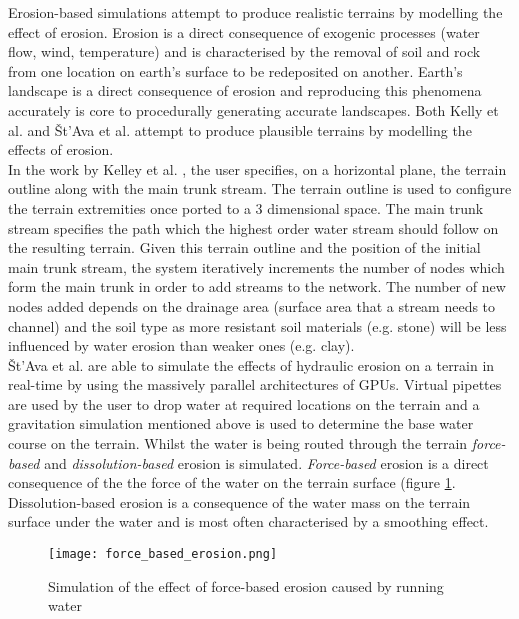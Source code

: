 Erosion-based simulations attempt to produce realistic terrains by modelling the effect of erosion. Erosion is a direct consequence of exogenic processes (water flow, wind, temperature) and is characterised by the removal of soil and rock from one location on earth's surface to be redeposited on another. Earth's landscape is a direct consequence of erosion and reproducing this phenomena accurately is core to procedurally generating accurate landscapes. Both Kelly et al. \cite{Kelley1988} and Št'Ava et al. \cite{StAva2008} attempt to produce plausible terrains by modelling the effects of erosion.\\

In the work by Kelley et al. \cite{Kelley1988}, the user specifies, on a horizontal plane, the terrain outline along with the main trunk stream. The terrain outline is used to configure the terrain extremities once ported to a 3 dimensional space. The main trunk stream specifies the path which the highest order water stream should follow on the resulting terrain. Given this terrain outline and the position of the initial main trunk stream, the system iteratively increments the number of nodes which form the main trunk in order to add streams to the network. The number of new nodes added depends on the drainage area (surface area that a stream needs to channel) and the soil type as more resistant soil materials (e.g. stone) will be less influenced by water erosion than weaker ones (e.g. clay). \\

Št'Ava et al. \cite{StAva2008} are able to simulate the effects of hydraulic erosion on a terrain in real-time by using the massively parallel architectures of GPUs. Virtual pipettes are used by the user to drop water at required locations on the terrain and a gravitation simulation mentioned above is used to determine the base water course on the terrain. Whilst the water is being routed through the terrain \textit{force-based} and \textit{dissolution-based} erosion is simulated. \textit{Force-based} erosion is a direct consequence of the the force of the water on the terrain surface (figure \ref{force-based erosion}. Dissolution-based erosion is a consequence of the water mass on the terrain surface under the water and is most often characterised by a smoothing effect.\\

\begin{figure}[h]
  \centering
	\label{force-based erosion}
	\texttt{[image: force\_based\_erosion.png]}
	\caption{Simulation of the effect of force-based erosion caused by running water \cite{StAva2008}}
\end{figure}


